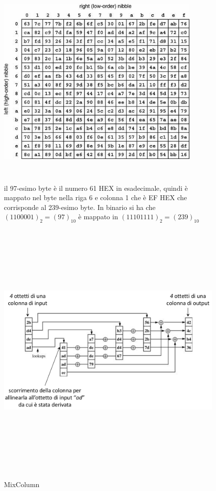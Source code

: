 \begin{figure}[htbp]
	\centering%
	\subfigure%
	{\includegraphics[height=10cm, width=10cm, keepaspectratio]{Immagini/Capitolo2/rijndael_sbox.png}}
	\caption{il 97-esimo byte è il numero 61 HEX in esadecimale, quindi è mappato nel byte nella riga 6 e colonna 1 che è EF HEX che corrisponde
al 239-esimo byte. In binario si ha che $(1100001)_{2} = (97)_{10}$
è mappato in $(11101111)_{2} = (239)_{10}$ \label{fig:Rij_mixcol}} 	
\end{figure}

\begin{figure}[htbp]
	\centering%
	\subfigure%
	{\includegraphics[height=13cm, width=13cm, keepaspectratio]{Immagini/Capitolo2/rijndael_mixcol.png}}
	\caption{MixColumn \label{fig:Rij_mixcol}} 	
\end{figure}

